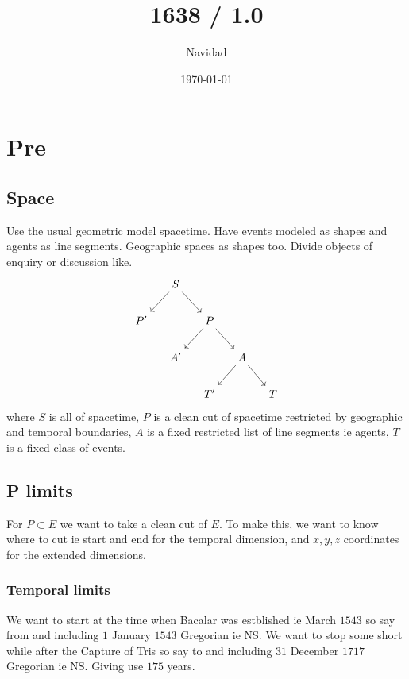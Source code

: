 \documentclass{amsart}
\title{1638 / 1.0}
\author{Navidad}
\date{\today}
\begin{document}
\maketitle
\section{Pre}
\subsection{Space}
Use the usual geometric model spacetime. Have events modeled as shapes and agents as line segments. Geographic spaces as shapes too. Divide objects of enquiry or discussion like.
	\[
 	\begin{tikzcd}[column sep=small]
				& S\ar[dl] \ar[dr]	& 	&	&\\
	P^\prime	&					& P\ar[dl]\ar[dr]&&\\
				&			A^\prime& 	&A\ar[dl]\ar[dr]&\\
				&					&T^\prime&	&T
	\end{tikzcd}
	\]
where \(S\) is all of spacetime, \(P\) is a clean cut of spacetime restricted by geographic and temporal boundaries, \(A\) is a fixed restricted list of line segments ie agents, \(T\) is a fixed class of events.
\subsection{P limits}
For \(P\subset E\) we want to take a clean cut of \(E\). To make this, we want to know where to cut ie start and end for the temporal dimension, and \(x, y, z\) coordinates for the extended dimensions.
\subsubsection{Temporal limits} We want to start at the time when Bacalar was estblished ie March \(1543\) so say from and including \(1\) January \(1543\) Gregorian ie NS. We want to stop some short while after the Capture of Tris so say to and including \(31\) December \(1717\) Gregorian ie NS. Giving use \(175\) years.
\end{document}

